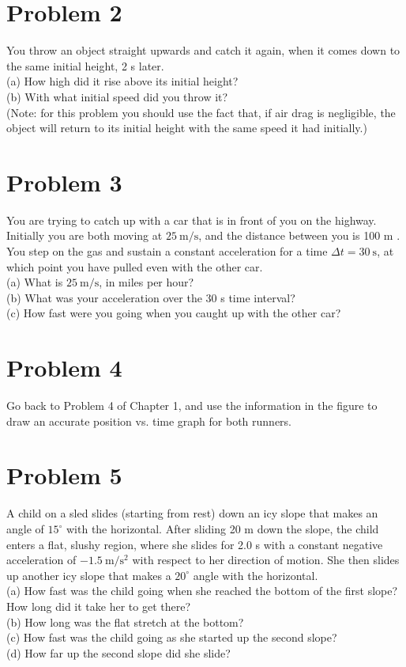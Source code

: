 \documentclass[10pt]{article}
\begin{document}
\section*{Problem 2}
You throw an object straight upwards and catch it again, when it comes down to the same initial height, 2 s later.\\
(a) How high did it rise above its initial height?\\
(b) With what initial speed did you throw it?\\
(Note: for this problem you should use the fact that, if air drag is negligible, the object will return to its initial height with the same speed it had initially.)

\section*{Problem 3}
You are trying to catch up with a car that is in front of you on the highway. Initially you are both moving at $25 \mathrm{~m} / \mathrm{s}$, and the distance between you is 100 m . You step on the gas and sustain a constant acceleration for a time $\Delta t=30 \mathrm{~s}$, at which point you have pulled even with the other car.\\
(a) What is $25 \mathrm{~m} / \mathrm{s}$, in miles per hour?\\
(b) What was your acceleration over the 30 s time interval?\\
(c) How fast were you going when you caught up with the other car?

\section*{Problem 4}
Go back to Problem 4 of Chapter 1, and use the information in the figure to draw an accurate position vs. time graph for both runners.

\section*{Problem 5}
A child on a sled slides (starting from rest) down an icy slope that makes an angle of $15^{\circ}$ with the horizontal. After sliding 20 m down the slope, the child enters a flat, slushy region, where she slides for 2.0 s with a constant negative acceleration of $-1.5 \mathrm{~m} / \mathrm{s}^{2}$ with respect to her direction of motion. She then slides up another icy slope that makes a $20^{\circ}$ angle with the horizontal.\\
(a) How fast was the child going when she reached the bottom of the first slope? How long did it take her to get there?\\
(b) How long was the flat stretch at the bottom?\\
(c) How fast was the child going as she started up the second slope?\\
(d) How far up the second slope did she slide?
\end{document}
